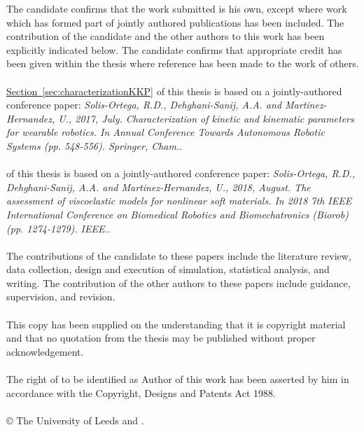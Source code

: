 
\begin{ipstatement}
The candidate confirms that the work submitted is his own, except where work which has formed part of jointly authored publications has been included. The contribution of the candidate and the other authors to this work has been explicitly indicated below. The candidate confirms that appropriate credit has been given within the thesis where reference has been made to the work of others.
\\
\\
\hyperref[sec:characterizationKKP]{Section~\ref*{sec:characterizationKKP}} of this thesis is based on a jointly-authored conference paper: \textit{Solis-Ortega, R.D., Dehghani-Sanij, A.A. and Martinez-Hernandez, U., 2017, July. Characterization of kinetic and kinematic parameters for wearable robotics. In Annual Conference Towards Autonomous Robotic Systems (pp. 548-556). Springer, Cham.}.
\\
\\
 of this thesis is based on a jointly-authored conference paper: \textit{Solis-Ortega, R.D., Dehghani-Sanij, A.A. and Martinez-Hernandez, U., 2018, August. The assessment of viscoelastic models for nonlinear soft materials. In 2018 7th IEEE International Conference on Biomedical Robotics and Biomechatronics (Biorob) (pp. 1274-1279). IEEE.}.
\\
\\
The contributions of the candidate to these papers include the literature review, data collection, design and execution of simulation, statistical analysis, and writing. The contribution of the other authors to these papers include guidance, supervision, and revision.
\\
\\
This copy has been supplied on the understanding that it is copyright material and that no quotation from the thesis may be published without proper acknowledgement.
\\
\\
The right of \theAuthor{} to be identified as Author of this work has been asserted by him in accordance with the Copyright, Designs and Patents Act 1988.
\\
\\
\copyright{} \yeardate{\today} The University of Leeds and \theAuthor{}.

\label{ips}
\end{ipstatement}


